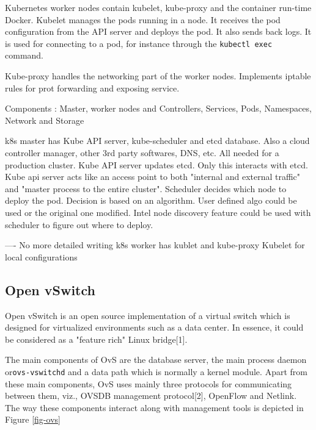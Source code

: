 \documentclass[english, 12pt, a4paper, elec, utf8, a-1b, online]{aaltothesis}
\begin{document}
Kubernetes worker nodes contain kubelet, kube-proxy and the container run-time Docker. Kubelet manages the pods running in a node. It receives the pod configuration from the API server and deploys the pod. It also sends back logs. It is used for connecting to a pod, for instance through the \lstinline{kubectl exec} command.

Kube-proxy handles the networking part of the worker nodes. Implements iptable rules for prot forwarding and exposing service.

Components : Master, worker nodes and Controllers, Services, Pods, Namespaces, Network and Storage

k8s master has Kube API server, kube-scheduler and etcd database.
Also a cloud controller manager, other 3rd party softwares, DNS, etc. All needed for a production cluster. Kube API server updates etcd. Only this interacts with etcd.
Kube api server acts like an access point to both "internal and external traffic" and "master process to the entire cluster".
Scheduler decides which node to deploy the pod. Decision is  based on an algorithm. User defined algo could be used or the original one modified. Intel node discovery feature could be used with scheduler to figure out where to deploy.

---- No more detailed writing
k8s worker has kublet and kube-proxy
Kubelet for local configurations

\subsection{Open vSwitch}
Open vSwitch is an open source implementation of a virtual switch which is designed for virtualized environments such as a data center. In essence, it could be considered as a "feature rich" Linux bridge[1].

The main components of OvS are the database server, the main process daemon or\lstinline{ovs-vswitchd} and a data path which is normally a kernel module. Apart from these main components, OvS uses mainly three protocols for communicating between them, viz., OVSDB management protocol[2], OpenFlow and Netlink. The way these components interact along with management tools is depicted in Figure \ref{fig-ovs}
\end{document}
